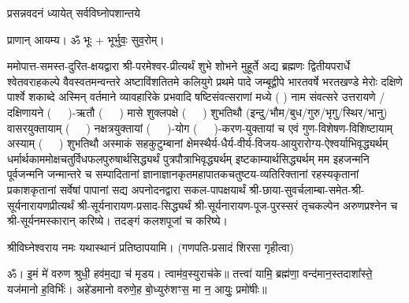 
\setlength{\parindent}{0pt}





{प्रसन्नवदनं ध्यायेत् सर्वविघ्नोपशान्तये}
 
प्राणान्  आयम्य।  ॐ भूः + भूर्भुवः॒ सुव॒रोम्।


ममोपात्त-समस्त-दुरित-क्षयद्वारा श्री-परमेश्वर-प्रीत्यर्थं शुभे शोभने मुहूर्ते अद्य ब्रह्मणः
द्वितीयपरार्धे श्वेतवराहकल्पे वैवस्वतमन्वन्तरे अष्टाविंशतितमे कलियुगे प्रथमे पादे
जम्बूद्वीपे भारतवर्षे भरतखण्डे मेरोः दक्षिणे पार्श्वे शकाब्दे अस्मिन् वर्तमाने व्यावहारिके
प्रभवादि षष्टिसंवत्सराणां मध्ये (	) नाम संवत्सरे उत्तरायणे / दक्षिणायने  \mbox{(~~~)}-ऋतौ  \mbox{(~~~)} मासे 
शुक्लपक्षे \mbox{(~~~)} शुभतिथौ (इन्दु/भौम/बुध/गुरु/भृगु/स्थिर/भानु) वासरयुक्तायाम्
\mbox{(~~~)} नक्षत्रयुक्तायां \mbox{(~~~)}-योग \mbox{(~~~)}-करण-युक्तायां च एवं गुण-विशेषण-विशिष्टायाम्
अस्याम् \mbox{(~~~)} शुभतिथौ अस्माकं सहकुटुम्बानां क्षेमस्थैर्य-धैर्य-वीर्य-विजय-आयुरारोग्य-ऐश्वर्याभिवृद्ध्यर्थम्
 धर्मार्थकाममोक्ष\-चतुर्विधफलपुरुषार्थसिद्ध्यर्थं पुत्रपौत्राभिवृद्ध्यर्थम् इष्टकाम्यार्थसिद्ध्यर्थम्
मम इहजन्मनि पूर्वजन्मनि जन्मान्तरे च सम्पादितानां ज्ञानाज्ञानकृतमहा\-पातकचतुष्टय-व्यतिरिक्तानां रहस्यकृतानां प्रकाशकृतानां सर्वेषां पापानां सद्य अपनोदनद्वारा सकल-पापक्षयार्थं 
श्री-छाया-सुवर्चलाम्बा-समेत-श्री-सूर्यनारायणप्रीत्यर्थं
श्री-सूर्यनारायण-प्रसाद-सिद्ध्यर्थं श्री-सूर्यनारायण-पूज-पुरस्सरं तृचकल्पेन अरुणप्रश्नेन च श्री-सूर्यनमस्कारान् 
करिष्ये। तदङ्गं कलशपूजां च करिष्ये।


श्रीविघ्नेश्वराय नमः यथास्थानं प्रतिष्ठापयामि।
(गणपति-प्रसादं शिरसा गृहीत्वा)












 

ॐ। इ॒मं मे॑ वरुण श्रुधी॒ हव॑म॒द्या च॑ मृडय। त्वाम॑व॒स्युराच॑के॥ तत्त्वा॑ यामि॒ ब्रह्म॑णा॒ वन्द॑मान॒स्तदाशा᳚स्ते॒ यज॑मानो ह॒विर्भिः॑। अहे॑डमानो वरुणे॒ह बो॒ध्युरु॑शꣳस॒ मा न॒ आयुः॒ प्रमो॑षीः॥

